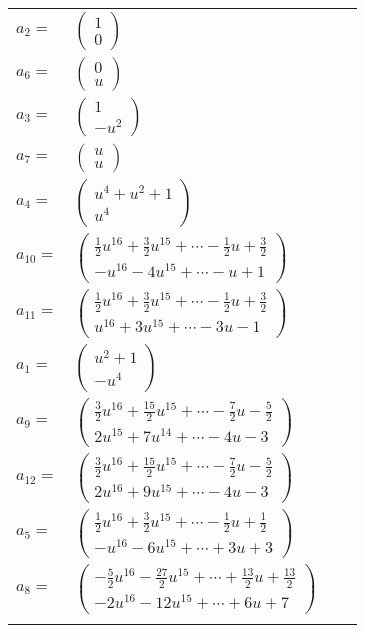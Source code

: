 \documentclass[1p]{elsarticle_modified}
\theoremstyle{definition}
\begin{document}
\begin{tabular}{m{7pt} m{180pt} m{7pt} m{180pt} }
\flushright $a_{2}=$&$\begin{pmatrix}1\\0\end{pmatrix}$ \\
\flushright $a_{6}=$&$\begin{pmatrix}0\\u\end{pmatrix}$ \\
\flushright $a_{3}=$&$\begin{pmatrix}1\\- u^2\end{pmatrix}$ \\
\flushright $a_{7}=$&$\begin{pmatrix}u\\u\end{pmatrix}$ \\
\flushright $a_{4}=$&$\begin{pmatrix}u^4+u^2+1\\u^4\end{pmatrix}$ \\
\flushright $a_{10}=$&$\begin{pmatrix}\frac{1}{2} u^{16}+\frac{3}{2} u^{15}+\cdots-\frac{1}{2} u+\frac{3}{2}\\- u^{16}-4 u^{15}+\cdots- u+1\end{pmatrix}$ \\
\flushright $a_{11}=$&$\begin{pmatrix}\frac{1}{2} u^{16}+\frac{3}{2} u^{15}+\cdots-\frac{1}{2} u+\frac{3}{2}\\u^{16}+3 u^{15}+\cdots-3 u-1\end{pmatrix}$ \\
\flushright $a_{1}=$&$\begin{pmatrix}u^2+1\\- u^4\end{pmatrix}$ \\
\flushright $a_{9}=$&$\begin{pmatrix}\frac{3}{2} u^{16}+\frac{15}{2} u^{15}+\cdots-\frac{7}{2} u-\frac{5}{2}\\2 u^{15}+7 u^{14}+\cdots-4 u-3\end{pmatrix}$ \\
\flushright $a_{12}=$&$\begin{pmatrix}\frac{3}{2} u^{16}+\frac{15}{2} u^{15}+\cdots-\frac{7}{2} u-\frac{5}{2}\\2 u^{16}+9 u^{15}+\cdots-4 u-3\end{pmatrix}$ \\
\flushright $a_{5}=$&$\begin{pmatrix}\frac{1}{2} u^{16}+\frac{3}{2} u^{15}+\cdots-\frac{1}{2} u+\frac{1}{2}\\- u^{16}-6 u^{15}+\cdots+3 u+3\end{pmatrix}$ \\
\flushright $a_{8}=$&$\begin{pmatrix}-\frac{5}{2} u^{16}-\frac{27}{2} u^{15}+\cdots+\frac{13}{2} u+\frac{13}{2}\\-2 u^{16}-12 u^{15}+\cdots+6 u+7\end{pmatrix}$\\&\end{tabular}
\end{document}
